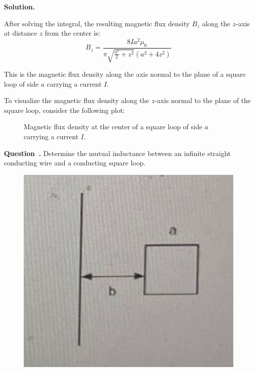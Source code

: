 \documentclass[12pt, a4paper, oneside]{report}
\newcounter{question}
\newenvironment{question}[1][]{\refstepcounter{question}\par\medskip
   \begin{mdframed}[backgroundcolor=gray!20]
   \noindent \textbf{Question~\thequestion. #1} \rmfamily}{\end{mdframed}\medskip}
\newenvironment{solution}{
  \par\medskip\noindent
  \textbf{Solution.}\quad\itshape
  \par\noindent\makebox[\linewidth]{\rule{\textwidth}{0.4pt}}
}{
  \par\noindent\makebox[\linewidth]{\rule{\textwidth}{0.4pt}}
  \par\medskip
}
\begin{document}
\begin{solution}
After solving the integral, the resulting magnetic flux density \(B_z\) along the \(z\)-axis at distance \(z\) from the center is:
\[
B_z = \frac{8 I a^2 \mu_0}{\pi \sqrt{\frac{a^2}{2} + z^2} (a^2 + 4 z^2)}
\]

This is the magnetic flux density along the axis normal to the plane of a square loop of side \(a\) carrying a current \(I\).


\newpage
To visualize the magnetic flux density along the \(z\)-axis normal to the plane of the square loop, consider the following plot:


\begin{figure}[ht!]
    \centering
    \caption{Magnetic flux density at the center of a square loop of side \(a\) carrying a current \(I\).}
    \label{fig:magnetic_flux_density}
\end{figure}


\end{solution}





\newpage

\begin{question}
Determine the mutual inductance between an infinite straight conducting wire and a conducting square loop.
\end{question}


\begin{figure}[ht!]
    \centering
    \includegraphics[width=0.25\linewidth]{image3.png}
    \caption{}
    \label{fig:enter-label}
\end{figure}
\end{document}

